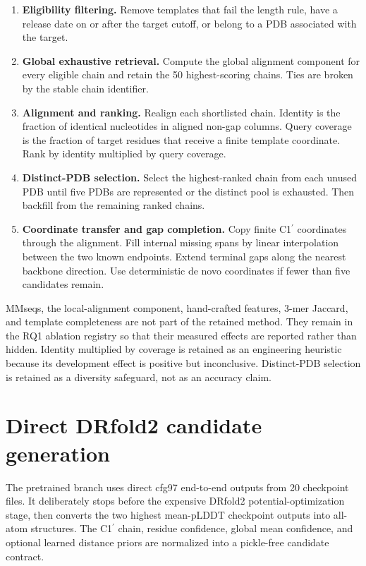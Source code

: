 \documentclass[12pt,a4paper,oneside]{report}
\newcommand{\cprime}{C1$^{\prime}$}
\begin{document}
\begin{enumerate}
  \item \textbf{Eligibility filtering.} Remove templates that fail the length rule,
  have a release date on or after the target cutoff, or belong to a PDB associated
  with the target.
  \item \textbf{Global exhaustive retrieval.} Compute the global alignment component
  for every eligible chain and retain the 50 highest-scoring chains. Ties are broken
  by the stable chain identifier.
  \item \textbf{Alignment and ranking.} Realign each shortlisted chain. Identity is
  the fraction of identical nucleotides in aligned non-gap columns. Query coverage is
  the fraction of target residues that receive a finite template coordinate. Rank by
  identity multiplied by query coverage.
  \item \textbf{Distinct-PDB selection.} Select the highest-ranked chain from each
  unused PDB until five PDBs are represented or the distinct pool is exhausted. Then
  backfill from the remaining ranked chains.
  \item \textbf{Coordinate transfer and gap completion.} Copy finite \cprime{}
  coordinates through the alignment. Fill internal missing spans by linear
  interpolation between the two known endpoints. Extend terminal gaps along the
  nearest backbone direction. Use deterministic de novo coordinates if fewer than
  five candidates remain.
\end{enumerate}

MMseqs, the local-alignment component, hand-crafted features, 3-mer Jaccard, and
template completeness are not part of the retained method. They remain in the RQ1
ablation registry so that their measured effects are reported rather than hidden.
Identity multiplied by coverage is retained as an engineering heuristic because its
development effect is positive but inconclusive. Distinct-PDB selection is retained
as a diversity safeguard, not as an accuracy claim.

\section{Direct DRfold2 candidate generation}

The pretrained branch uses direct cfg97 end-to-end outputs from 20 checkpoint files.
It deliberately stops before the expensive DRfold2 potential-optimization stage, then
converts the two highest mean-pLDDT checkpoint outputs into all-atom structures. The
\cprime{} chain, residue confidence, global mean confidence, and optional learned
distance priors are normalized into a pickle-free candidate contract.
\end{document}
